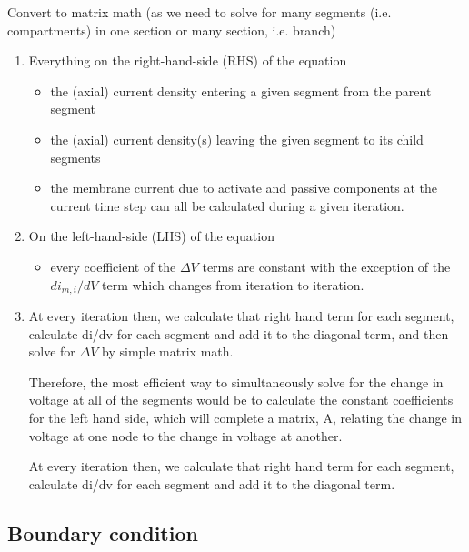 Convert to matrix math (as we need to solve for many segments (i.e.
compartments) in one section or many section, i.e. branch)
\begin{enumerate}
  
  \item Everything on the right-hand-side (RHS) of the equation
  \begin{itemize}
    \item the (axial) current density entering a given segment from the parent
    segment
    \item the (axial) current density(s) leaving the given segment to its child
    segments
    
    \item the membrane current due to activate and passive components at the
    current time step can all be calculated during a given iteration.
  \end{itemize}
  
  \item On the left-hand-side (LHS) of the equation
  \begin{itemize}
    \item every coefficient of the  $\Delta V$  terms are constant with the
    exception of the $di_{m,i}/dV$ term which changes from iteration to
    iteration.
  \end{itemize}
  
  \item  At every iteration then, we calculate that right hand term for each
  segment, calculate di/dv for each segment and add it to the diagonal term, and
  then solve for $\Delta V$ by simple matrix math.

 Therefore, the most efficient way to simultaneously solve for the change in
voltage at all of the segments would be to calculate the constant coefficients
for the left hand side, which will complete a matrix, A, relating the change in
voltage at one node to the change in voltage at another.  

At every iteration then, we calculate that right hand term for each segment,
calculate di/dv for each segment and add it to the diagonal term.


\end{enumerate}

\subsection{Boundary condition}
\label{sec:boundary-condition-cable-neuron}

